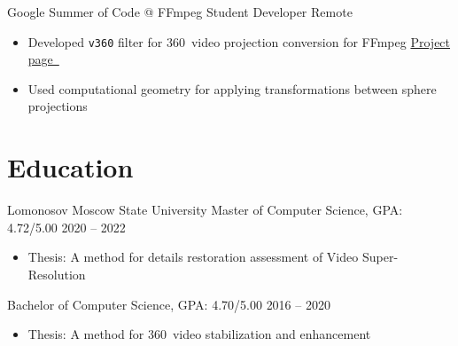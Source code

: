 \documentclass{tccv}
\newcommand{\sphere}{360\textdegree~}
\begin{document}
\begin{eventlist}
     {Google Summer of Code @ FFmpeg}
     {Student Developer}
     {Remote}
\begin{itemize}
     \item Developed \texttt{v360} filter for \sphere video projection conversion for FFmpeg\hfill
     \href{https://unishift.github.io/project/2019-08-26-gsoc-ffmpeg}{Project page~\faExternalLink*}
     \item Used computational geometry for applying transformations between sphere projections
\end{itemize}

\end{eventlist}

\section{Education}

\begin{eventlist}

\evententry{}
     {Lomonosov Moscow State University}
     {Master of Computer Science, GPA: 4.72/5.00}
     {2020 -- 2022}
     \begin{itemize}
          \item Thesis: A method for details restoration assessment of Video Super-Resolution
     \end{itemize}

\evententry{}
     {}
     {Bachelor of Computer Science, GPA: 4.70/5.00}
     {2016 -- 2020}
     \begin{itemize}
          \item Thesis: A method for \sphere video stabilization and enhancement
     \end{itemize}

\end{eventlist}
\end{document}
